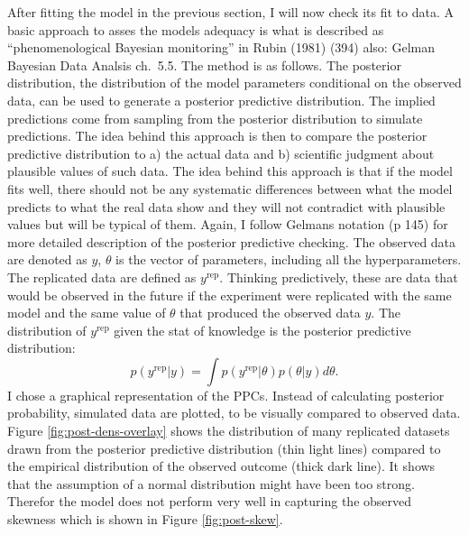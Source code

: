 \documentclass[a4, 12pt]{article}
\begin{document}
\label{subsec:validation}
After fitting the model in the previous section, I will now check its fit to data. A basic approach to asses the models adequacy is what is described as ``phenomenological Bayesian monitoring'' in Rubin (1981) (394) also: Gelman Bayesian Data Analsis ch.~5.5. The method is as follows. The posterior distribution, the distribution of the model parameters conditional on the observed data, can be used to generate a posterior predictive distribution. The implied predictions come from sampling from the posterior distribution to simulate predictions. The idea behind this approach is then to compare the posterior predictive distribution to a) the actual data and b) scientific judgment about plausible values of such data. The idea behind this approach is that if the model fits well, there should not be any systematic differences between what the model predicts to what the real data show and they will not contradict with plausible values but will be typical of them. Again, I follow Gelmans notation (p 145) for more detailed description of the posterior predictive checking. The observed data are denoted as \(y\), \(\theta\) is the vector of parameters, including all the hyperparameters. The replicated data are defined as \(y^{\mathrm{rep}}\). Thinking predictively, these are data that would be observed in the future if the experiment were replicated with the same model and the same value of \(\theta\) that produced the observed data \(y\). The distribution of \(y^{\mathrm{rep}}\) given the stat of knowledge is the posterior predictive distribution:
\[p(y^{\mathrm{rep}}|y)=\int p(y^{\mathrm{rep}}|\theta)p(\theta|y)d\theta.\]
I chose a graphical representation of the PPCs. Instead of calculating posterior probability, simulated data are plotted, to be visually compared to observed data.
Figure \ref{fig:post-dens-overlay} shows the distribution of many replicated datasets drawn from the posterior predictive distribution (thin light lines) compared to the empirical distribution of the observed outcome (thick dark line). It shows that the assumption of a normal distribution might have been too strong. Therefor the model does not perform very well in capturing the observed skewness which is shown in Figure \ref{fig:post-skew}.
\end{document}
